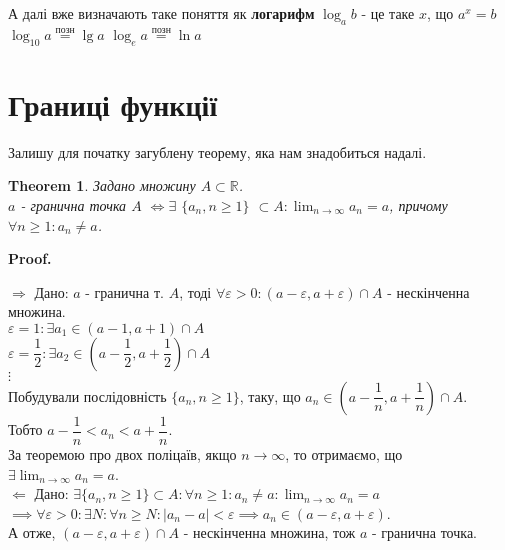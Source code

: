 \documentclass[a4paper, 14pt]{article}
\makeatletter
\def\qed{$\blacksquare$}
\def\rightproof{$\boxed{\Rightarrow}$ }
\def\leftproof{$\boxed{\Leftarrow}$ }
\theoremstyle{theoremdd}
\newtheorem{theorem}{Theorem}[subsection]
\theoremstyle{theoremdd}
\theoremstyle{theoremdd}
\theoremstyle{theoremdd}
\theoremstyle{theoremdd}
\theoremstyle{theoremdd}
\theoremstyle{theoremdd}
\theoremstyle{theoremdd}
\renewenvironment{proof}[1][Proof.\\]{\par
\pushQED{\hfill \qed}%
\normalfont \topsep6\p@\@plus6\p@\relax
\trivlist
\item\relax
{\bfseries
#1\@addpunct{.}}\hspace\labelsep\ignorespaces
}{%
\popQED\endtrivlist\@endpefalse
}
\makeatother
\begin{document}
А далі вже визначають таке поняття як \textbf{логарифм} $\displaystyle\log_a b$ - це таке $x$, що $a^x = b$\\
$\log_{10} a \overset{\text{позн}}{=} \lg a$ \hspace{0.5cm} $\log_e a \overset{\text{позн}}{=} \ln a$
	\newpage
	
	
	\setcounter{section}{3}
	\section{Границі функції}
	Залишу для початку загублену теорему, яка нам знадобиться надалі.
	\begin{theorem}
	Задано множину $A \subset \mathbb{R}$.\\
	$a$ - гранична точка $A$ $\iff \exists$ $\{a_n, n \geq 1\}$ $\subset A: \displaystyle \lim_{n \to \infty} a_n = a$, причому $\forall n \geq 1: a_n \neq a$.
	\end{theorem}
	
	\begin{proof}
	\rightproof Дано: $a$ - гранична т. $A$, тоді $\forall \varepsilon > 0: (a-\varepsilon, a + \varepsilon) \cap A$ - нескінченна множина.\\
	$\varepsilon = 1: \exists a_1 \in (a-1,a+1) \cap A$\\
	$\varepsilon = \dfrac{1}{2}: \exists a_2 \in (a-\dfrac{1}{2}, a+\dfrac{1}{2}) \cap A$\\
	$\vdots$\\
	Побудували послідовність $\{a_n, n \geq 1\}$, таку, що $a_n \in (a-\dfrac{1}{n}, a+\dfrac{1}{n}) \cap A$.\\
	Тобто $a - \dfrac{1}{n} < a_n < a + \dfrac{1}{n}$.\\
	За теоремою про двох поліцаїв, якщо $n \to \infty$, то отримаємо, що $\exists \displaystyle \lim_{n \to \infty} a_n = a$.
	\bigskip \\
	
	\leftproof Дано: $\exists \{a_n, n \geq 1\} \subset A: \forall n \geq 1: a_n \neq a: \displaystyle \lim_{n \to \infty} a_n = a$\\
	$\implies \forall \varepsilon > 0: \exists N: \forall n \geq N: |a_n-a|<\varepsilon \implies a_n \in (a-\varepsilon,a+\varepsilon)$.\\
	А отже, $(a-\varepsilon,a+\varepsilon) \cap A$ - нескінченна множина, тож $a$ - гранична точка.
\end{proof}
\end{document}
